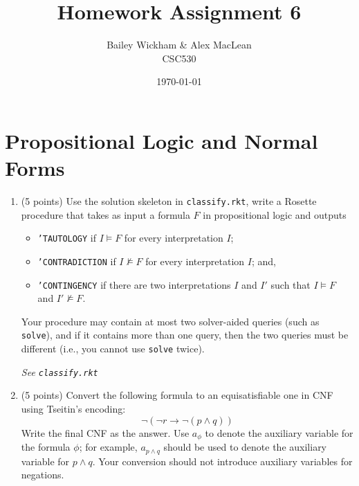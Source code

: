 \documentclass{article}
\title{\vspace{-2cm}Homework Assignment 6}
\author{Bailey Wickham \& Alex MacLean\\ CSC530}
\date\today
\newenvironment{solution}{\color{blue} \em }{}
\begin{document}
\maketitle

\section{Propositional Logic and Normal Forms}


\begin{enumerate}
\item (5 points) \label{prob:classify} Use the solution skeleton in \texttt{classify.rkt},
write a Rosette procedure that takes as input a formula $F$ in propositional logic and outputs
\begin{itemize}
	\item \texttt{'TAUTOLOGY} if $I \models F$ for every interpretation $I$;
	\item \texttt{'CONTRADICTION} if $I \not\models F$ for every interpretation $I$; and,
	\item \texttt{'CONTINGENCY} if there are two interpretations $I$ and $I'$ such that $I\models F$ and $I'\not\models F$.
\end{itemize}
Your procedure may contain at most two solver-aided queries (such as \texttt{solve}),
	and if it contains more than one query, then the two queries must be different (i.e., you cannot use \texttt{solve} twice).

\begin{solution}
	See \texttt{classify.rkt}
\end{solution}

\item (5 points)  Convert the following formula to an equisatisfiable one in CNF using Tseitin's encoding:
\[\neg ( \neg r \rightarrow \neg (p \land q))\]
Write the final CNF as the answer.
Use $a_\phi$ to denote the auxiliary variable for the formula $\phi$;
for example, $a_{p\wedge q}$ should be used to denote the auxiliary variable for $p\wedge q$.
Your conversion should not introduce auxiliary variables for negations.

\begin{solution}


\end{solution}
\end{enumerate}
\end{document}
